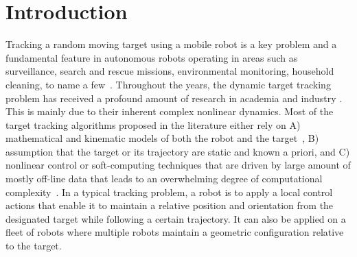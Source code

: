 \documentclass[conference]{IEEEtran}
\begin{document}

\section{Introduction}
\label{sec:introduction}


Tracking a random moving target using a mobile robot is a key problem and a
fundamental feature in autonomous robots operating in areas such as
surveillance, search and rescue missions, environmental monitoring, household
cleaning, to name a
few~\cite{kolling2006,Encarnacao2001,Ju2001,Kitowski2012,Zhang2013}. Throughout
the years, the dynamic target tracking problem has received a profound amount of
research in academia and industry \cite{wei2018,liu2019}. This is mainly due to
their inherent complex nonlinear dynamics. Most of the target tracking
algorithms proposed in the literature either rely on A) mathematical and
kinematic models of both the robot and the target~\cite{Huang2008}, B) 
assumption that the target or its trajectory are static and known a priori, and
C) nonlinear control or soft-computing techniques that are driven by large
amount of mostly off-line data that leads to an overwhelming degree of
computational complexity~\cite{KD2007,Cren2017}. In a typical tracking problem,
a robot is to apply a local control actions that enable it to maintain a
relative position and orientation from the designated target while following a
certain trajectory. It can also be applied on a fleet of robots where multiple
robots maintain a geometric configuration relative to the
target\cite{Oh2015-Survey,Liu2017-Modular}.



\end{document}

